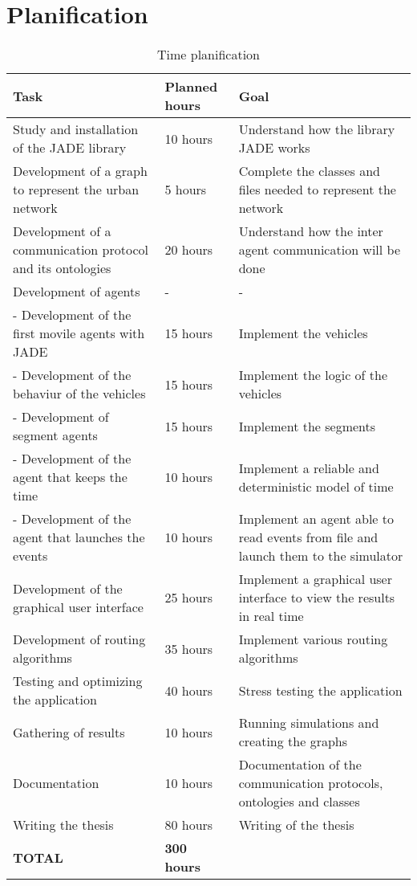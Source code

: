\section{Planification}

\begin{table}[H]
\centering
\begin{tabularx}{\textwidth}{|X|l|X|}
\hline 
\textbf{Task} & \textbf{Planned hours} & \textbf{Goal} \\ 
\hline 
Study and installation of the JADE library & 10 hours & Understand how the library JADE works \\ 
\hline 
Development of a graph to represent the urban network & 5 hours & Complete the classes and files needed to represent the network \\ 
\hline 
Development of a communication protocol and its ontologies & 20 hours & Understand how the inter agent communication will be done \\ 
\hline 
Development of agents & - & - \\ 
\hline 
- Development of the first movile agents with JADE & 15 hours & Implement the vehicles \\ 
\hline 
- Development of the behaviur of the vehicles & 15 hours & Implement the logic of the vehicles \\ 
\hline 
- Development of segment agents & 15 hours & Implement the segments \\ 
\hline 
- Development of the agent that keeps the time & 10 hours & Implement a reliable and deterministic model of time \\ 
\hline 
- Development of the agent that launches the events & 10 hours & Implement an agent able to read events from file and launch them to the simulator \\ 
\hline 
Development of the graphical user interface & 25 hours & Implement a graphical user interface to view the results in real time \\ 
\hline 
Development of routing algorithms & 35 hours & Implement various routing algorithms \\ 
\hline 
Testing and optimizing the application & 40 hours & Stress testing the application \\ 
\hline 
Gathering of results & 10 hours & Running simulations and creating the graphs \\ 
\hline 
Documentation & 10 hours & Documentation of the communication protocols, ontologies and classes \\ 
\hline 
Writing the thesis & 80 hours & Writing of the thesis \\ 
\hline 
\textbf{TOTAL} & \textbf{300 hours} &  \\ 
\hline 
\end{tabularx}
\caption{Time planification}
\end{table}

